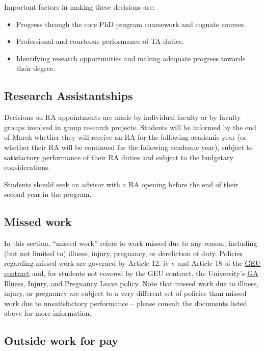 Important factors in making these decisions are:

\begin{itemize}
\item Progress through the core PhD program coursework and 
cognate courses.
\item Professional and courteous performance of TA duties.
\item Identifying research opportunities and making adequate progress
towards their degree.
\end{itemize}

\subsection{Research Assistantships}

Decisions on RA appointments are made by individual faculty or by
faculty groups involved in group research projects. Students will be
informed by the end of March whether they will receive an RA for the
following academic year (or whether their RA will be continued for
the following academic year), subject to satisfactory performance of
their RA duties and subject to the budgetary considerations.

Students should seek an advisor with a RA opening before the end of
their second year in the program.

\subsection{Missed work}

In this section, ``missed work'' refers to work missed due to any
reason, including (but not limited to) illness, injury, pregnancy, or
dereliction of duty.  Policies regarding missed work are governed by
Article 12. iv-v and Article 18 of the
\href{https://www.hr.msu.edu/documents/contracts/GEU2015-2019.pdf}{GEU
contract} and, for students not covered by the GEU contract, the
University's
\href{https://reg.msu.edu/AcademicPrograms/Text.aspx?Section=111#s351}{GA
Illness, Injury, and Pregnancy Leave policy}.  Note that missed work
due to illness, injury, or pregnancy are subject to a very different
set of policies than missed work due to unsatisfactory performance --
please consult the documents listed above for more information.


\subsection{Outside work for pay}

